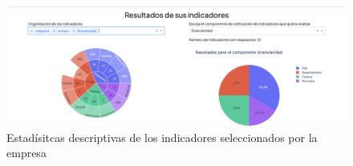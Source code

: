 \begin{figure}[H]
        \centering
        \includegraphics[scale=0.25]{images/99-aplicacion-web/10-respuestas-indicadores.png}
        \caption{Estadísitcas descriptivas de los indicadores seleccionados por la empresa}
\end{figure}